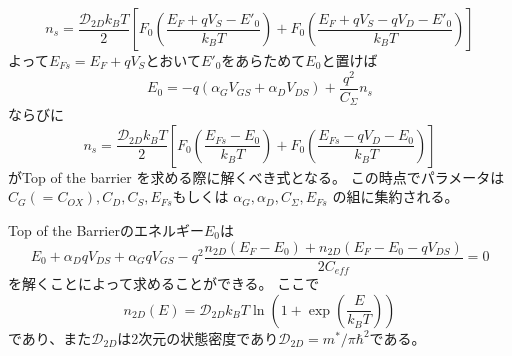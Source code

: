\documentclass[11pt,uplatex,a4paper]{jsarticle}
\begin{document}
\begin{equation}
 n_s = \frac{\mathcal{D}_{2D}k_B T}{2}
  \left[
   F_0(\frac{E_F + q V_S - E'_0}{k_B T})+
   F_0(\frac{E_F + q V_S - q V_D- E'_0}{k_B T})
									 \right]
\end{equation}
よって$E_{Fs}=E_F+ q V_S$とおいて$E'_0$をあらためて$E_0$と置けば
\begin{equation}
 E_0 = -q(\alpha_G V_{GS} + \alpha_D V_{DS}) + \frac{q^2}{C_{\Sigma}} n_s
\end{equation}
ならびに
\begin{equation}
 n_s = \frac{\mathcal{D}_{2D}k_B T}{2}
  \left[
   F_0(\frac{E_{Fs} - E_0}{k_B T})+
   F_0(\frac{E_{Fs} - q V_D- E_0}{k_B T})
									 \right]
\end{equation}
がTop of the barrier を求める際に解くべき式となる。
この時点でパラメータは$C_{G} (=C_{OX}), C_{D}, C_{S}, E_{Fs}$もしくは
$\alpha_{G}, \alpha_{D}, C_{\Sigma}, E_{Fs}$
の組に集約される。



Top of the Barrierのエネルギー$E_0$は
\begin{equation}
 E_0 + \alpha_D q V_{DS} + \alpha_G q V_{GS} -
  q^2\frac{n_{2D}(E_F - E_0)+n_{2D}(E_F-E_0-qV_{DS})}{2 C_{eff}}=0
  \label{eqn:tob}
\end{equation}
を解くことによって求めることができる。
ここで
\begin{equation}
 n_{2D}(E) = \mathcal{D}_{2D}k_B T \ln (1+\exp(\frac{E}{k_B T}))
\end{equation}
であり、また$\mathcal{D}_{2D}$は2次元の状態密度であり$\mathcal{D}_{2D}=m^*/\pi \hbar^2$である。
\end{document}
